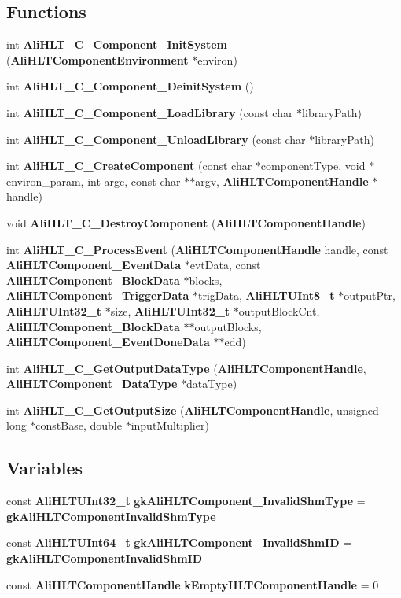 \subsection*{Functions}
\begin{CompactItemize}
\item 
int {\bf Ali\-HLT\_\-C\_\-Component\_\-Init\-System} ({\bf Ali\-HLTComponent\-Environment} $\ast$environ)
\item 
int {\bf Ali\-HLT\_\-C\_\-Component\_\-Deinit\-System} ()
\item 
int {\bf Ali\-HLT\_\-C\_\-Component\_\-Load\-Library} (const char $\ast$library\-Path)
\item 
int {\bf Ali\-HLT\_\-C\_\-Component\_\-Unload\-Library} (const char $\ast$library\-Path)
\item 
int {\bf Ali\-HLT\_\-C\_\-Create\-Component} (const char $\ast$component\-Type, void $\ast$environ\_\-param, int argc, const char $\ast$$\ast$argv, {\bf Ali\-HLTComponent\-Handle} $\ast$handle)
\item 
void {\bf Ali\-HLT\_\-C\_\-Destroy\-Component} ({\bf Ali\-HLTComponent\-Handle})
\item 
int {\bf Ali\-HLT\_\-C\_\-Process\-Event} ({\bf Ali\-HLTComponent\-Handle} handle, const {\bf Ali\-HLTComponent\_\-Event\-Data} $\ast$evt\-Data, const {\bf Ali\-HLTComponent\_\-Block\-Data} $\ast$blocks, {\bf Ali\-HLTComponent\_\-Trigger\-Data} $\ast$trig\-Data, {\bf Ali\-HLTUInt8\_\-t} $\ast$output\-Ptr, {\bf Ali\-HLTUInt32\_\-t} $\ast$size, {\bf Ali\-HLTUInt32\_\-t} $\ast$output\-Block\-Cnt, {\bf Ali\-HLTComponent\_\-Block\-Data} $\ast$$\ast$output\-Blocks, {\bf Ali\-HLTComponent\_\-Event\-Done\-Data} $\ast$$\ast$edd)
\item 
int {\bf Ali\-HLT\_\-C\_\-Get\-Output\-Data\-Type} ({\bf Ali\-HLTComponent\-Handle}, {\bf Ali\-HLTComponent\_\-Data\-Type} $\ast$data\-Type)
\item 
int {\bf Ali\-HLT\_\-C\_\-Get\-Output\-Size} ({\bf Ali\-HLTComponent\-Handle}, unsigned long $\ast$const\-Base, double $\ast$input\-Multiplier)
\end{CompactItemize}
\subsection*{Variables}
\begin{CompactItemize}
\item 
const {\bf Ali\-HLTUInt32\_\-t} {\bf gk\-Ali\-HLTComponent\_\-Invalid\-Shm\-Type} = {\bf gk\-Ali\-HLTComponent\-Invalid\-Shm\-Type}
\item 
const {\bf Ali\-HLTUInt64\_\-t} {\bf gk\-Ali\-HLTComponent\_\-Invalid\-Shm\-ID} = {\bf gk\-Ali\-HLTComponent\-Invalid\-Shm\-ID}
\item 
const {\bf Ali\-HLTComponent\-Handle} {\bf k\-Empty\-HLTComponent\-Handle} = 0
\end{CompactItemize}


